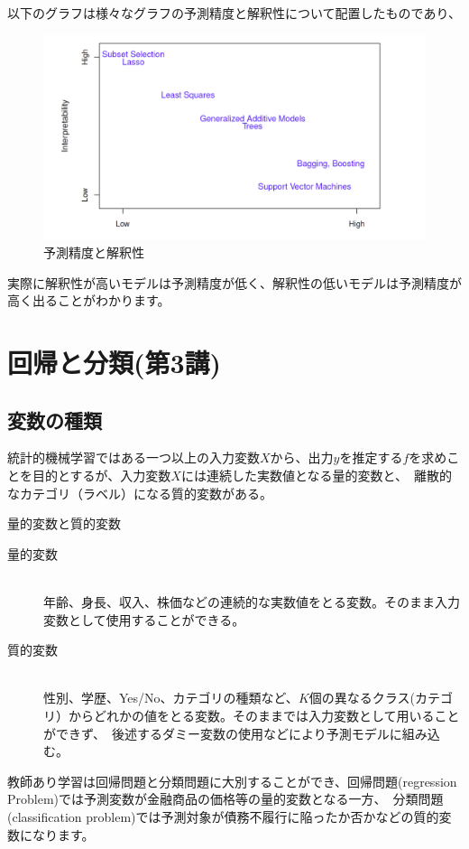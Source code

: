 \documentclass[uplatex]{jsarticle}
\begin{document}
以下のグラフは様々なグラフの予測精度と解釈性について配置したものであり、
\begin{figure}
  \begin{center}
    \includegraphics[width=13cm]{img/tradeoff.png}
    \caption{予測精度と解釈性}
  \end{center}
\end{figure}
実際に解釈性が高いモデルは予測精度が低く、解釈性の低いモデルは予測精度が高く出ることがわかります。

\section{回帰と分類(第3講)}
\subsection{変数の種類}
統計的機械学習ではある一つ以上の入力変数$X$から、出力$y$を推定する$f$を求めことを目的とするが、入力変数$X$には連続した実数値となる量的変数と、\
離散的なカテゴリ（ラベル）になる質的変数がある。
\begin{itembox}[l]{量的変数と質的変数}
  \begin{description}
    \item [量的変数]\mbox{}\\
    年齢、身長、収入、株価などの連続的な実数値をとる変数。そのまま入力変数として使用することができる。
    \item [質的変数]\mbox{}\\
    性別、学歴、Yes/No、カテゴリの種類など、$K$個の異なるクラス(カテゴリ）からどれかの値をとる変数。そのままでは入力変数として用いることができず、\
    後述するダミー変数の使用などにより予測モデルに組み込む。
  \end{description}
\end{itembox}
教師あり学習は回帰問題と分類問題に大別することができ、回帰問題(regression Problem)では予測変数が金融商品の価格等の量的変数となる一方、\
分類問題(classification problem)では予測対象が債務不履行に陥ったか否かなどの質的変数になります。\\
\end{document}
